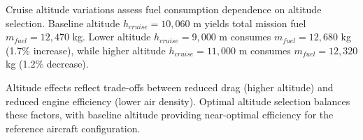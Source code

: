 Cruise altitude variations assess fuel consumption dependence on altitude selection. Baseline altitude $h_{cruise} = 10,060$ m yields total mission fuel $m_{fuel} = 12,470$ kg. Lower altitude $h_{cruise} = 9,000$ m consumes $m_{fuel} = 12,680$ kg (1.7\% increase), while higher altitude $h_{cruise} = 11,000$ m consumes $m_{fuel} = 12,320$ kg (1.2\% decrease).

Altitude effects reflect trade-offs between reduced drag (higher altitude) and reduced engine efficiency (lower air density). Optimal altitude selection balances these factors, with baseline altitude providing near-optimal efficiency for the reference aircraft configuration.